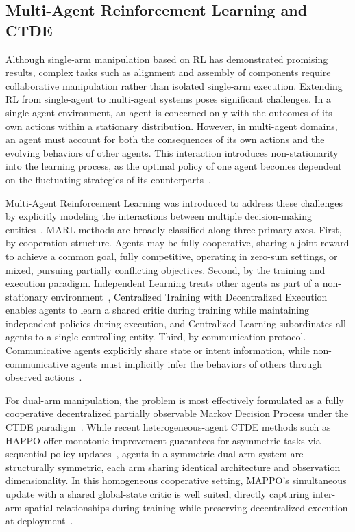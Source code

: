 \subsection{Multi-Agent Reinforcement Learning and CTDE}\label{subsec:lit_marl}

Although single-arm manipulation based on RL has demonstrated promising results, complex tasks such
as alignment and assembly of components require collaborative manipulation rather than isolated
single-arm execution. Extending RL from single-agent to multi-agent systems poses significant
challenges. In a single-agent environment, an agent is concerned only with the outcomes of its own
actions within a stationary distribution. However, in multi-agent domains, an agent must account for
both the consequences of its own actions and the evolving behaviors of other agents. This
interaction introduces non-stationarity into the learning process, as the optimal policy of one
agent becomes dependent on the fluctuating strategies of its
counterparts~\citep{low2025cooperative,nguyen2020deep}.

Multi-Agent Reinforcement Learning was introduced to address these challenges by explicitly
modeling the interactions between multiple decision-making
entities~\citep{albrecht2024multi,low2025cooperative}. MARL methods are broadly classified along
three primary axes. First, by cooperation structure. Agents may be fully cooperative, sharing a
joint reward to achieve a common goal, fully competitive, operating in zero-sum settings, or mixed,
pursuing partially conflicting objectives. Second, by the training and execution paradigm.
Independent Learning treats other agents as part of a non-stationary
environment~\citep{dewitt2020independent}, Centralized Training with Decentralized Execution enables
agents to learn a shared critic during training while maintaining independent policies during
execution, and Centralized Learning subordinates all agents to a single controlling entity. Third,
by communication protocol. Communicative agents explicitly share state or intent information, while
non-communicative agents must implicitly infer the behaviors of others through observed
actions~\citep{liu2024efficient, chai2025survey}.

For dual-arm manipulation, the problem is most effectively formulated as a fully cooperative
decentralized partially observable Markov Decision Process under the CTDE
paradigm~\citep{yu2022surprising}. While recent heterogeneous-agent CTDE methods such as
HAPPO offer monotonic improvement guarantees for asymmetric tasks via sequential policy
updates~\citep{kuba2021trust}, agents in a symmetric dual-arm system are structurally symmetric,
each arm sharing identical architecture and observation dimensionality. In this homogeneous
cooperative setting, MAPPO's simultaneous update with a shared global-state critic is well suited,
directly capturing inter-arm spatial relationships during training while preserving decentralized
execution at deployment~\citep{chai2025survey}.

